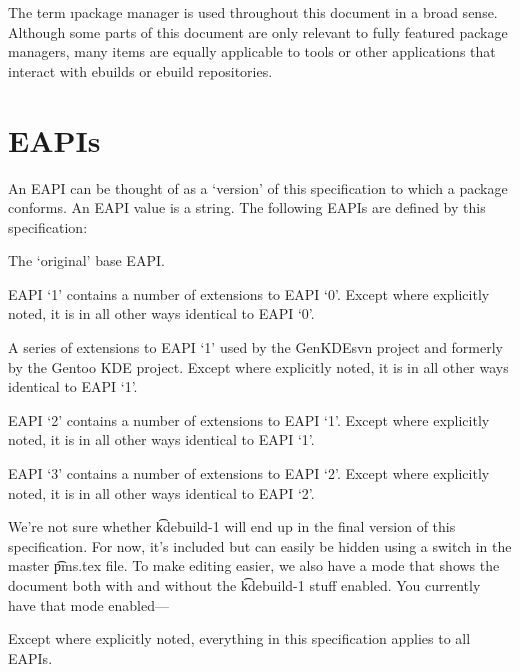 The term \i{package manager} is used throughout this document in a broad sense. Although some parts
of this document are only relevant to fully featured package managers, many items are equally
applicable to tools or other applications that interact with ebuilds or ebuild repositories.

\section{EAPIs}

An EAPI can be thought of as a `version' of this specification to which a package conforms. An EAPI
value is a string. The following EAPIs are defined by this specification:

\begin{description}
\item[0] The `original' base EAPI.
\item[1] EAPI `1' contains a number of extensions to EAPI `0'. Except where explicitly noted, it is
    in all other ways identical to EAPI `0'.
\IFKDEBUILDELSE
{
    \item[kdebuild-1] A series of extensions to EAPI `1' used by the GenKDEsvn project and
        formerly by the Gentoo KDE project. Except where
        explicitly noted, it is in all other ways identical to EAPI `1'.
}{
}
\item[2] EAPI `2' contains a number of extensions to EAPI `1'. Except where explicitly noted, it is
    in all other ways identical to EAPI `1'.
\item[3] EAPI `3' contains a number of extensions to EAPI `2'. Except where explicitly noted, it is
    in all other ways identical to EAPI `2'.
\end{description}

{
    \note We're not sure whether \t{kdebuild-1} will end up in the final version of this
    specification. For now, it's included but can easily be hidden using a switch in the master
    \t{pms.tex} file. To make editing easier, we also have a mode that shows the document both with
    and without the \t{kdebuild-1} stuff enabled. You currently have that mode enabled---
}{
}

Except where explicitly noted, everything in this specification applies to all EAPIs.

